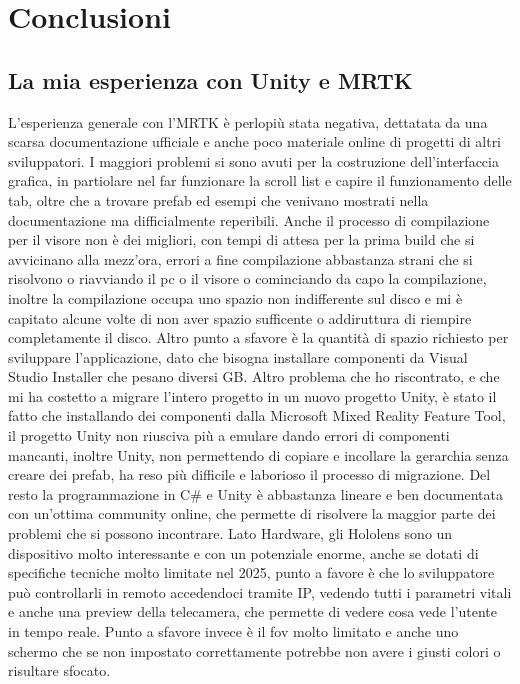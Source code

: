 \chapter{Conclusioni}
\pagestyle{plain}

\section{La mia esperienza con Unity e MRTK}
L'esperienza generale con l'MRTK è perlopiù stata negativa, dettatata da una scarsa documentazione ufficiale e anche poco materiale online di progetti di altri sviluppatori. I maggiori problemi si sono avuti per la costruzione dell'interfaccia grafica, in partiolare nel far funzionare la scroll list e capire il funzionamento delle tab, oltre che a trovare prefab ed esempi che venivano mostrati nella documentazione ma difficialmente reperibili. Anche il processo di compilazione per il visore non è dei migliori, con tempi di attesa per la prima build che si avvicinano alla mezz'ora, errori a fine compilazione abbastanza strani che si risolvono o riavviando il pc o il visore o cominciando da capo la compilazione, inoltre la compilazione occupa uno spazio non indifferente sul disco e mi è capitato alcune volte di non aver spazio sufficente o addiruttura di riempire completamente il disco. Altro punto a sfavore è la quantità di spazio richiesto per sviluppare l'applicazione, dato che bisogna installare componenti da Visual Studio Installer che pesano diversi GB. Altro problema che ho riscontrato, e che mi ha costetto a migrare l'intero progetto in un nuovo progetto Unity, è stato il fatto che installando dei componenti dalla Microsoft Mixed Reality Feature Tool, il progetto Unity non riusciva più a emulare dando errori di componenti mancanti, inoltre Unity, non permettendo di copiare e incollare la gerarchia senza creare dei prefab, ha reso più difficile e laborioso il processo di migrazione. Del resto la programmazione in C\# e Unity è abbastanza lineare e ben documentata con un'ottima community online, che permette di risolvere la maggior parte dei problemi che si possono incontrare. Lato Hardware, gli Hololens sono un dispositivo molto interessante e con un potenziale enorme, anche se dotati di specifiche tecniche molto limitate nel 2025, punto a favore è che lo sviluppatore può controllarli in remoto accedendoci tramite IP, vedendo tutti i parametri vitali e anche una preview della telecamera, che permette di vedere cosa vede l'utente in tempo reale. Punto a sfavore invece è il fov molto limitato e anche uno schermo che se non impostato correttamente potrebbe non avere i giusti colori o risultare sfocato.
